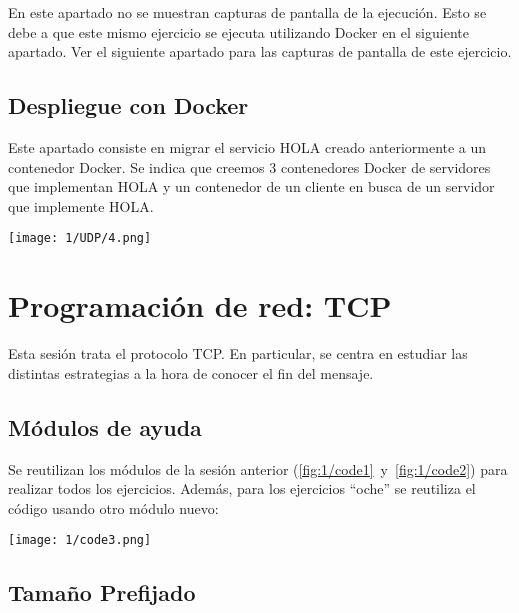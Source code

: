 \begin{notebox}
    En este apartado no se muestran capturas de pantalla de la ejecución.
    Esto se debe a que este mismo ejercicio se ejecuta utilizando Docker en el siguiente apartado.
    Ver el siguiente apartado para las capturas de pantalla de este ejercicio.
\end{notebox}

\subsection{Despliegue con Docker}

Este apartado consiste en migrar el servicio HOLA creado anteriormente a un contenedor Docker.
Se indica que creemos 3 contenedores Docker de servidores que implementan HOLA
y un contenedor de un cliente en busca de un servidor que implemente HOLA.

\begin{minipage}{\linewidth}
	\centering
	\texttt{[image: 1/UDP/4.png]}
	\label{fig:1/2}
\end{minipage}

\section{Programación de red: TCP}

Esta sesión trata el protocolo TCP.
En particular, se centra en estudiar las distintas estrategias a la hora
de conocer el fin del mensaje.

\subsection{Módulos de ayuda}
Se reutilizan los módulos de la sesión anterior (\ref{fig:1/code1}~y~\ref{fig:1/code2}) para
realizar todos los ejercicios. Además, para los ejercicios ``oche'' se reutiliza el código
usando otro módulo nuevo: \\
\begin{minipage}{\linewidth}
	\centering
	\texttt{[image: 1/code3.png]}
	\label{fig:1/code3}
\end{minipage}

\subsection{Tamaño Prefijado}

